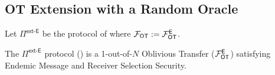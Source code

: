 \subsection{OT Extension with a Random Oracle}\label{sec:extSec}


\begin{definition}\label{def:ext_E_E}
	Let $\Pi^{\textsf{ext-E}}$ be the protocol of  where $\mathcal{F}_{\mathsf{OT}}:=\mathcal{F}_{\mathsf{OT}}^\mathsf{E}$.
\end{definition}



\begin{lemma}\label{lem:ext-E}
	The $\Pi^{\textsf{ext-E}}$ protocol () is a 1-out-of-$N$ Oblivious Transfer ($\mathcal{F}_{\mathsf{OT}}^\mathsf{E}$) satisfying Endemic Message and Receiver Selection Security.
\end{lemma}
